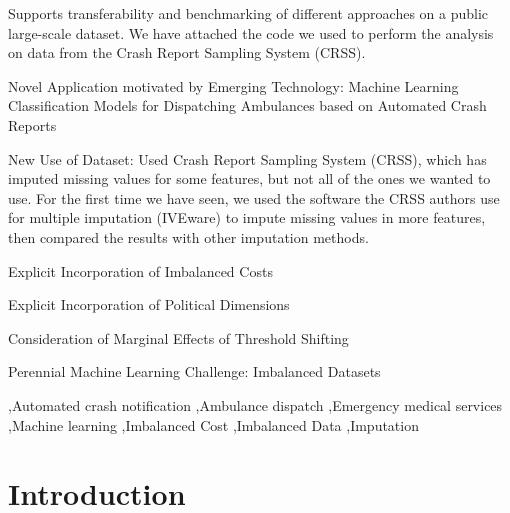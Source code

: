 \documentclass[fleqn]{cas-sc}
\begin{document}
\begin{graphicalabstract}



\end{graphicalabstract}

\begin{highlights}
	\item  Supports transferability and benchmarking of different approaches on a public large-scale dataset.  We have attached the code we used to perform the analysis on data from the Crash Report Sampling System (CRSS).  
	\item Novel Application motivated by Emerging Technology:  Machine Learning Classification Models for Dispatching Ambulances based on Automated Crash Reports
	\item New Use of Dataset:  Used Crash Report Sampling System (CRSS), which has imputed missing values for some features, but not all of the ones we wanted to use.  For the first time we have seen, we used the software the CRSS authors use for multiple imputation (IVEware) to impute missing values in more features, then compared the results with other imputation methods.
	\item Explicit Incorporation of Imbalanced Costs
	\item Explicit Incorporation of Political Dimensions
	\item Consideration of Marginal Effects of Threshold Shifting
	\item Perennial Machine Learning Challenge:  Imbalanced Datasets
\end{highlights}

\begin{keywords}
 \sep Automated crash notification 
 \sep Ambulance dispatch 
 \sep Emergency medical services  
 \sep Machine learning 
 \sep Imbalanced Cost 
 \sep Imbalanced Data 
 \sep Imputation
\end{keywords}

\maketitle


%
%
%


\section{Introduction}\label{sec:Introduction}
%
\end{document}
